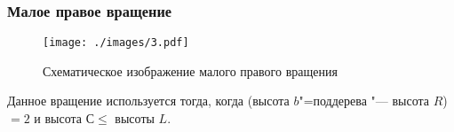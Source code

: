 \begin{frame}
    \frametitle{Малое правое вращение}

    \begin{figure}[ht]
        \texttt{[image: ./images/3.pdf]}
        
        \caption{Схематическое изображение малого правого вращения}
    \end{figure}

    Данное вращение используется тогда,
    когда (высота $b$"=поддерева "--- высота $R$)
    $= 2$ и высота $С \leqslant $ высоты $L$.
\end{frame}